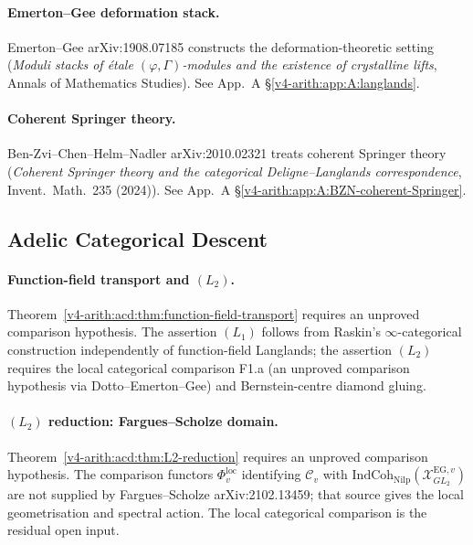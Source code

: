 \paragraph{Emerton--Gee deformation stack.}
Emerton--Gee arXiv:1908.07185 constructs the deformation-theoretic setting
(\emph{Moduli stacks of \'etale \((\varphi,\Gamma)\)-modules and the
existence of crystalline lifts}, Annals of Mathematics Studies).
See App.~A \S\ref{v4-arith:app:A:langlands}.

\paragraph{Coherent Springer theory.}
Ben-Zvi--Chen--Helm--Nadler arXiv:2010.02321 treats coherent Springer theory (\emph{Coherent Springer theory and the categorical
Deligne--Langlands correspondence}, Invent.~Math.~235 (2024)).
See App.~A \S\ref{v4-arith:app:A:BZN-coherent-Springer}.

\subsection{Adelic Categorical Descent}
\label{v4-arith:w3-comparison-A:ch27}

\paragraph{Function-field transport and \((L_2)\).}
Theorem~\ref{v4-arith:acd:thm:function-field-transport} requires
an unproved comparison hypothesis. The assertion \((L_{1})\) follows
from Raskin's \(\infty\)-categorical construction independently of
function-field Langlands; the assertion \((L_{2})\) requires the
local categorical comparison F1.a (an unproved comparison hypothesis
via Dotto--Emerton--Gee) and Bernstein-centre diamond gluing.

\paragraph{\((L_2)\) reduction: Fargues--Scholze domain.}
Theorem~\ref{v4-arith:acd:thm:L2-reduction} requires
an unproved comparison hypothesis. The comparison functors
\(\Phi^{\mathrm{loc}}_{v}\) identifying \(\mathcal{C}_{v}\) with
\(\mathrm{IndCoh}_{\mathrm{Nilp}}(\mathcal{X}^{\mathrm{EG},v}_{GL_{2}})\)
are not supplied by Fargues--Scholze arXiv:2102.13459; that source
gives the local geometrisation and spectral action. The local
categorical comparison is the residual open input.

